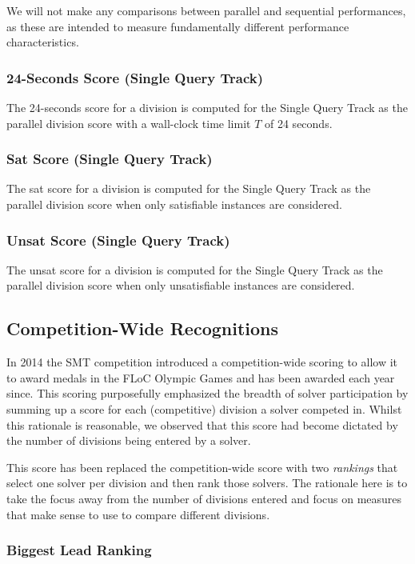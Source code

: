\documentclass[12pt]{article}
\newcommand{\maintrack}{Single Query Track\xspace}
\begin{document}
We will not make any comparisons between parallel and sequential performances,
as these are intended to measure fundamentally different performance
characteristics.

\subsubsection{24-Seconds Score (\maintrack)}

The 24-seconds score for a division is computed for the \maintrack as the
parallel division score with a wall-clock time limit $T$ of 24 seconds.

\subsubsection{Sat Score (\maintrack)}

The sat score for a division is computed for the \maintrack as the
parallel division score when only satisfiable instances are considered.

\subsubsection{Unsat Score (\maintrack)}
The unsat score for a division is computed for the \maintrack as the
parallel division score when only unsatisfiable instances are considered.


\subsection{Competition-Wide Recognitions}

In 2014 the SMT competition introduced a competition-wide scoring to allow it to award medals in the FLoC Olympic Games and has been awarded each year since. This scoring purposefully emphasized the breadth of solver participation by summing up a score for each (competitive) division a solver competed in. Whilst this rationale is reasonable, we observed that this score had become dictated by the number of divisions being entered by a solver.

This score has been replaced the competition-wide score with two \emph{rankings} that select one solver per division and then rank those solvers. The rationale here is to take the focus away from the number of divisions entered and focus on measures that make sense to use to compare different divisions.

\subsubsection{Biggest Lead Ranking}
\end{document}
